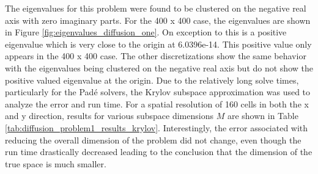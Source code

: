 The eigenvalues for this problem were found to be clustered on the negative real axis with zero imaginary parts. For the 400 x 400 case, the eigenvalues are shown in Figure \ref{fig:eigenvalues_diffusion_one}.  On exception to this is a positive eigenvalue which is very close to the origin at 6.0396e-14. This positive value only appears in the 400 x 400 case. The other discretizations show the same behavior with the eigenvalues being clustered on the negative real axis but do not show the positive valued eigenvalue at the origin. Due to the relatively long solve times, particularly for the Pad\'e solvers, the Krylov subspace approximation was used to analyze the error and run time. For a spatial resolution of 160 cells in both the x and y direction, results for various subspace dimensions $M$ are shown in Table \ref{tab:diffusion_problem1_results_krylov}. Interestingly, the error associated with reducing the overall dimension of the problem did not change, even though the run time drastically decreased leading to the conclusion that the dimension of the true space is much smaller. 


\FloatBarrier

